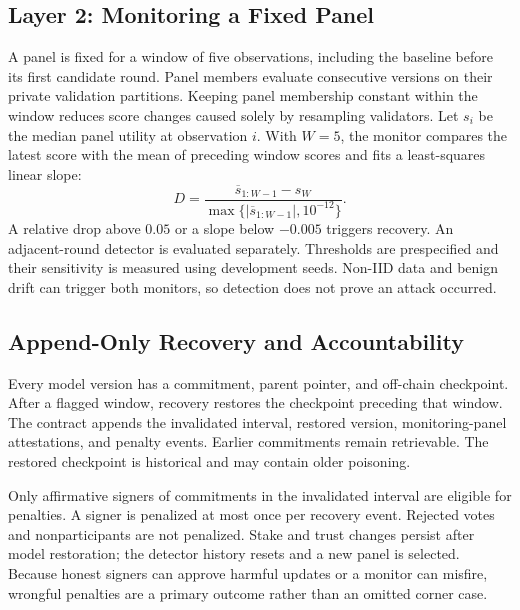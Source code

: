 \subsection{Layer 2: Monitoring a Fixed Panel}
A panel is fixed for a window of five observations, including the baseline
before its first candidate round. Panel members evaluate consecutive versions
on their private validation partitions. Keeping panel membership constant within
the window reduces score changes caused solely by resampling validators.
Let $s_i$ be the median panel utility at observation $i$. With $W=5$, the monitor
compares the latest score with the mean of preceding window scores and fits
a least-squares linear slope:
\begin{equation}
 D=\frac{\overline{s}_{1:W-1}-s_W}{\max\{|\overline{s}_{1:W-1}|,10^{-12}\}}.
\end{equation}
A relative drop above $0.05$ or a slope below $-0.005$ triggers recovery.
An adjacent-round detector is evaluated separately. Thresholds are prespecified
and their sensitivity is measured using development seeds. Non-IID data and benign
drift can trigger both monitors, so detection does not prove an attack occurred.

\subsection{Append-Only Recovery and Accountability}
Every model version has a commitment, parent pointer, and off-chain checkpoint.
After a flagged window, recovery restores the checkpoint preceding that window.
The contract appends the invalidated interval, restored version, monitoring-panel
attestations, and penalty events. Earlier commitments remain retrievable.
The restored checkpoint is historical and may contain older poisoning.

Only affirmative signers of commitments in the invalidated interval are eligible
for penalties. A signer is penalized at most once per recovery event. Rejected
votes and nonparticipants are not penalized. Stake and trust changes persist after
model restoration; the detector history resets and a new panel is selected.
Because honest signers can approve harmful updates or a monitor can misfire,
wrongful penalties are a primary outcome rather than an omitted corner case.
